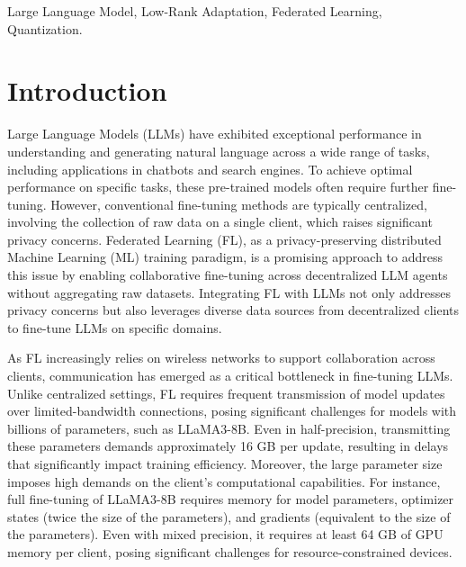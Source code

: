 \documentclass[journal]{IEEEtran}
\begin{document}
\begin{IEEEkeywords}
Large Language Model, Low-Rank Adaptation, Federated Learning, Quantization.
\end{IEEEkeywords}

\section{Introduction}
Large Language Models (LLMs) have exhibited exceptional performance in understanding and generating natural language across a wide range of tasks, including applications in chatbots and search engines\cite{zhao2023survey, chang2024survey,naveed2023comprehensive}. To achieve optimal performance on specific tasks, these pre-trained models often require further fine-tuning. However, conventional fine-tuning methods are typically centralized, involving the collection of raw data on a single client, which raises significant privacy concerns. 
Federated Learning (FL), as a privacy-preserving distributed Machine Learning (ML) training paradigm\cite{mcmahan2017communication,zhang2021survey,wen2023survey}, is a promising approach to address this issue by enabling collaborative fine-tuning across decentralized LLM agents without aggregating raw datasets. Integrating FL with LLMs not only addresses privacy concerns but also leverages diverse data sources from decentralized clients to fine-tune LLMs on specific domains.


As FL increasingly relies on wireless networks to support collaboration across clients, communication has emerged as a critical bottleneck in fine-tuning LLMs. Unlike centralized settings, FL requires frequent transmission of model updates over limited-bandwidth connections, posing significant challenges for models with billions of parameters, such as LLaMA3-8B\cite{dubey2024llama}. Even in half-precision, transmitting these parameters demands approximately 16 GB per update, resulting in delays that significantly impact training efficiency. Moreover, the large parameter size imposes high demands on the client's computational capabilities. For instance, full fine-tuning of LLaMA3-8B requires memory for model parameters, optimizer states (twice the size of the parameters), and gradients (equivalent to the size of the parameters). Even with mixed precision, it requires at least 64 GB of GPU memory per client, posing significant challenges for resource-constrained devices.
\end{document}
